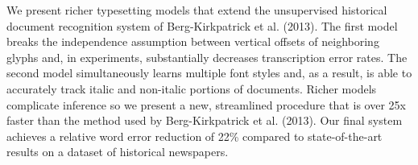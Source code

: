 We present richer typesetting models that extend the unsupervised historical document recognition system of Berg-Kirkpatrick et al. (2013). The first model breaks the independence assumption between vertical offsets of neighboring glyphs and, in experiments, substantially decreases transcription error rates. The second model simultaneously learns multiple font styles and, as a result, is able to accurately track italic and non-italic portions of documents. Richer models complicate inference so we present a new, streamlined procedure that is over 25x faster than the method used by Berg-Kirkpatrick et al. (2013). Our final system achieves a relative word error reduction of 22\% compared to state-of-the-art results on a dataset of historical newspapers.
